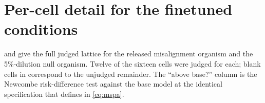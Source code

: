 \section{Per-cell detail for the finetuned conditions}
\label{app:cells}

 and  give the full judged lattice for the released misalignment organism and the 5\%-dilution null organism. Twelve of the sixteen cells were judged for each; blank cells in  correspond to the unjudged remainder. The ``above base?'' column is the Newcombe risk-difference test against the base model at the identical specification that defines \mspa in \eqref{eq:mspa}.

\begin{table}[h]
    \centering
    \caption{Released misalignment organism (\released), $12$ of $16$ lattice cells judged. The three cells that exceed the base model directionally all involve the domain-cued question set \qset, which is the organism-attributable signal; none of them clears $\tau$ significantly at $n=3$--$4$.}
    \label{tab:rbad_cells}
\end{table}
